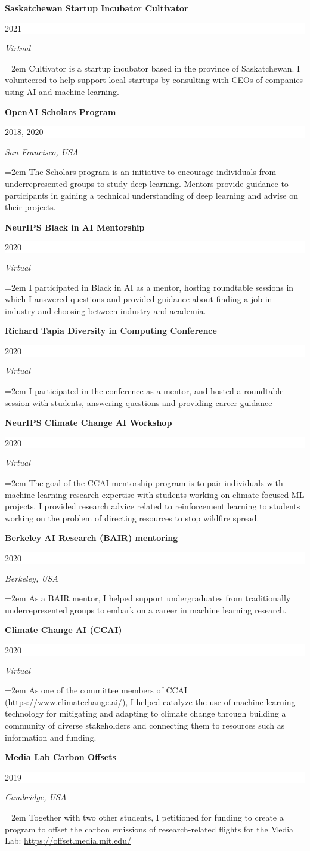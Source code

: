 \documentclass[paper=letter,fontsize=11pt]{scrartcl} %
\newcommand{\sepspace}{\vspace*{1em}}		%
\newcommand{\ServiceEntry}[4]{
		\noindent \textbf{#1} \hfill      %
		\colorbox{White}{%
			\parbox{10em}{%
			\hfill\color{Black}#2}} \par  %
		\noindent \textit{#3} \par  %
		\noindent\hangindent=2em\hangafter=0 \small #4 %
		\normalsize \par}
\begin{document}
\ServiceEntry{Saskatchewan Startup Incubator Cultivator}{2021}{Virtual}
{Cultivator is a startup incubator based in the province of Saskatchewan. I volunteered to help support local startups by consulting with CEOs of companies using AI and machine learning.}
\sepspace

\ServiceEntry{OpenAI Scholars Program}{2018, 2020}{San Francisco, USA}
{The Scholars program is an initiative to encourage individuals from underrepresented groups to study deep learning. Mentors provide guidance to participants in gaining a technical understanding of deep learning and advise on their projects.}
\sepspace

\ServiceEntry{NeurIPS Black in AI Mentorship}{2020}{Virtual}
{I participated in Black in AI as a mentor, hosting roundtable sessions in which I answered questions and provided guidance about finding a job in industry and choosing between industry and academia.}
\sepspace

\ServiceEntry{Richard Tapia Diversity in Computing Conference}{ 2020}{Virtual}
{I participated in the conference as a mentor, and hosted a roundtable session with students, answering questions and providing career guidance}
\sepspace

\ServiceEntry{NeurIPS Climate Change AI Workshop}{2020}{Virtual}
{The goal of the CCAI mentorship program is to pair individuals with machine learning research expertise with students working on climate-focused ML projects. I provided research advice related to reinforcement learning to students working on the problem of directing resources to stop wildfire spread.}
\sepspace

\ServiceEntry{Berkeley AI Research (BAIR) mentoring}{2020}{Berkeley, USA}
{As a BAIR mentor, I helped support undergraduates from traditionally underrepresented groups to embark on a career in machine learning research.}
\sepspace

\ServiceEntry{Climate Change AI (CCAI)}{2020}{Virtual}
{As one of the committee members of CCAI (\url{https://www.climatechange.ai/}), I helped catalyze the use of machine learning technology for mitigating and adapting to climate change through building a community of diverse stakeholders and connecting them to resources such as information and funding.}
\sepspace

\ServiceEntry{Media Lab Carbon Offsets}{2019}{Cambridge, USA}
{Together with two other students, I petitioned for funding to create a program to offset the carbon emissions of research-related flights for the Media Lab: \url{https://offset.media.mit.edu/}}
\sepspace
\end{document}
